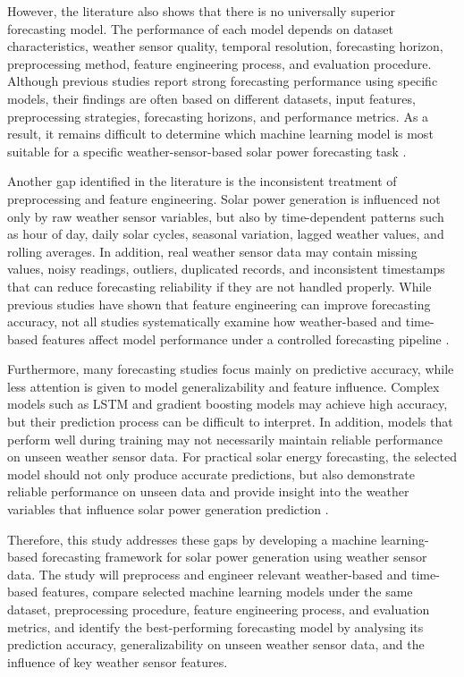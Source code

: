 However, the literature also shows that there is no universally superior forecasting model. The performance of each model depends on dataset characteristics, weather sensor quality, temporal resolution, forecasting horizon, preprocessing method, feature engineering process, and evaluation procedure. Although previous studies report strong forecasting performance using specific models, their findings are often based on different datasets, input features, preprocessing strategies, forecasting horizons, and performance metrics. As a result, it remains difficult to determine which machine learning model is most suitable for a specific weather-sensor-based solar power forecasting task \parencite{ArellanosTafur2025, TsaiLo2025, CarvalhoJunior2025}.

Another gap identified in the literature is the inconsistent treatment of preprocessing and feature engineering. Solar power generation is influenced not only by raw weather sensor variables, but also by time-dependent patterns such as hour of day, daily solar cycles, seasonal variation, lagged weather values, and rolling averages. In addition, real weather sensor data may contain missing values, noisy readings, outliers, duplicated records, and inconsistent timestamps that can reduce forecasting reliability if they are not handled properly. While previous studies have shown that feature engineering can improve forecasting accuracy, not all studies systematically examine how weather-based and time-based features affect model performance under a controlled forecasting pipeline \parencite{JnanaVarshitha2025, Pongphaw2025, TsaiLo2025, Duvuru2026}.

Furthermore, many forecasting studies focus mainly on predictive accuracy, while less attention is given to model generalizability and feature influence. Complex models such as LSTM and gradient boosting models may achieve high accuracy, but their prediction process can be difficult to interpret. In addition, models that perform well during training may not necessarily maintain reliable performance on unseen weather sensor data. For practical solar energy forecasting, the selected model should not only produce accurate predictions, but also demonstrate reliable performance on unseen data and provide insight into the weather variables that influence solar power generation prediction \parencite{Eren2025, TsaiLo2025, JnanaVarshitha2025, Ma2025}.

Therefore, this study addresses these gaps by developing a machine learning-based forecasting framework for solar power generation using weather sensor data. The study will preprocess and engineer relevant weather-based and time-based features, compare selected machine learning models under the same dataset, preprocessing procedure, feature engineering process, and evaluation metrics, and identify the best-performing forecasting model by analysing its prediction accuracy, generalizability on unseen weather sensor data, and the influence of key weather sensor features.

